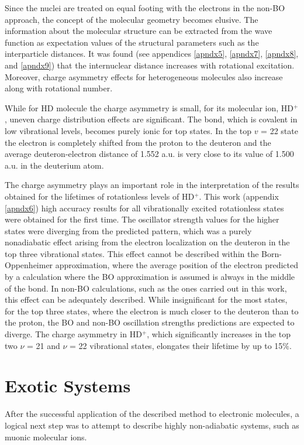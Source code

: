 Since the nuclei are treated on equal footing with the electrons in the non-BO approach, 
the concept of the molecular geometry becomes elusive. The information about the molecular
structure can be extracted from the wave function as expectation values of the structural
parameters such as the interparticle distances. It was found (see appendices \ref{apndx5},
\ref{apndx7}, \ref{apndx8}, and \ref{apndx9}) that the internuclear distance increases
with rotational excitation. Moreover, charge asymmetry effects for heterogeneous molecules
also increase along with rotational number. 

While for HD molecule the charge asymmetry is small, for its molecular ion, HD$^+$,
uneven charge distribution effects are significant. The bond, which is covalent in low
vibrational levels, becomes purely ionic for top states. In the top $v$ = 22 state the 
electron is completely shifted from the proton to the deuteron and the average 
deuteron-electron distance of 1.552 a.u. is very close to its value of 1.500 a.u.
in the deuterium atom.

The charge asymmetry plays an important role in the interpretation of the results
obtained for the lifetimes of rotationless levels of HD$^+$. This work (appendix
\ref{apndx6}) high accuracy results for all vibrationally excited rotationless states 
were obtained for the first time. The oscillator strength values for the higher
states were diverging from the predicted pattern, which was a 
purely nonadiabatic effect arising from the electron localization on the
deuteron in the top three vibrational states. This effect cannot be described within 
the Born-Oppenheimer approximation, where the average position of the electron predicted 
by a calculation where the BO approximation is assumed is always in the middle of the bond. 
In non-BO calculations, such as the ones carried out in this work, this effect can be
adequately described. While insignificant for the most states, for the top three states, 
where the electron is much closer to the deuteron than to the proton, the BO and non-BO oscillation strengths predictions are expected to diverge.
The charge asymmetry in HD$^+$, which significantly increases in the top two 
$ν$ = 21 and $ν$ = 22 vibrational states, elongates their lifetime by up to 15$\%$.

\section{Exotic Systems}

After the successful application of the described method to electronic molecules,
a logical next step was to attempt to describe highly non-adiabatic systems, such
as muonic molecular ions. 

